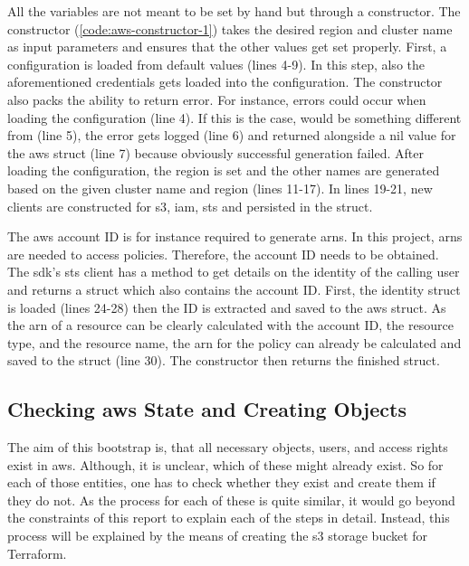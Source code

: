 All the variables are not meant to be set by hand but through a constructor.
The constructor (\autoref{code:aws-constructor-1}) takes the desired region and cluster name as input parameters and ensures that the other values get set properly.
First, a configuration is loaded from default values (lines 4-9).
In this step, also the aforementioned credentials gets loaded into the configuration.
The constructor also packs the ability to return error.
For instance, errors could occur when loading the configuration (line 4).
If this is the case,  would be something different from  (line 5), the error gets logged (line 6) and returned alongside a nil value for the \ac{aws} struct (line 7) because obviously successful generation failed.
After loading the configuration, the region is set and the other names are generated based on the given cluster name and region (lines 11-17).
In lines 19-21, new clients are constructed for \ac{s3}, \ac{iam}, \ac{sts} and persisted in the struct.

The \ac{aws} account ID is for instance required to generate \acp{arn}.
In this project, \acp{arn} are needed to access policies.
Therefore, the account ID needs to be obtained.
The \ac{sdk}'s \ac{sts} client has a method to get details on the identity of the calling user and returns a struct which also contains the account ID.
First, the identity struct is loaded (lines 24-28) then the ID is extracted and saved to the \ac{aws} struct.
As the \ac{arn} of a resource can be clearly calculated with the account ID, the resource type, and the resource name, the \ac{arn} for the policy can already be calculated and saved to the struct (line 30).
The constructor then returns the finished struct.



\subsection{Checking \ac{aws} State and Creating Objects}
The aim of this bootstrap is, that all necessary objects, users, and access rights exist in \ac{aws}.
Although, it is unclear, which of these might already exist.
So for each of those entities, one has to check whether they exist and create them if they do not.
As the process for each of these is quite similar, it would go beyond the constraints of this report to explain each of the steps in detail.
Instead, this process will be explained by the means of creating the \ac{s3} storage bucket for Terraform.

